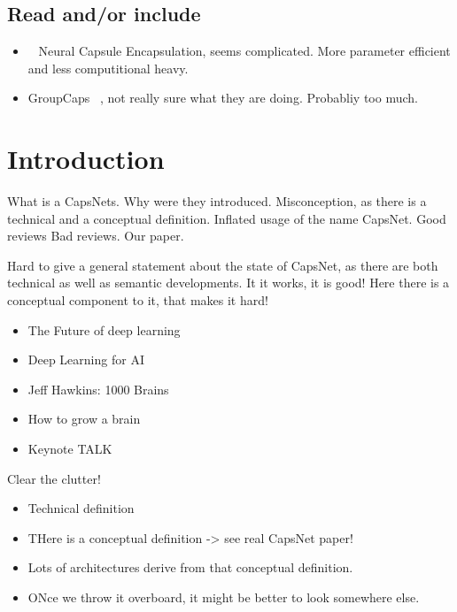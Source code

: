 \documentclass{article}
\begin{document}
\subsection*{Read and/or include}
\begin{itemize}
	\item ~\cite{eccv/LiGDOW18} Neural Capsule Encapsulation, seems complicated. More parameter efficient and less computitional heavy.
	\item GroupCaps ~\cite{cvpr/ChenJSWS18}, not really sure what they are doing. Probabliy too much.
\end{itemize}

\section{Introduction}

What is a CapsNets.
Why were they introduced.
Misconception, as there is a technical and a conceptual definition.
Inflated usage of the name CapsNet.
Good reviews
Bad reviews.
Our paper.

Hard to give a general statement about the state of CapsNet, as there are both technical as well as semantic developments.
It it works, it is good! Here there is a conceptual component to it, that makes it hard!

\begin{itemize}
	\item The Future of deep learning
	\item Deep Learning for AI
	\item Jeff Hawkins: 1000 Brains
	\item How to grow a brain
	\item Keynote TALK
\end{itemize}

Clear the clutter!
\begin{itemize}
	\item Technical definition
	\item THere is a conceptual definition -> see real CapsNet paper!
	\item Lots of architectures derive from that conceptual definition.
	\item ONce we throw it overboard, it might be better to look somewhere else.
\end{itemize}
\end{document}
